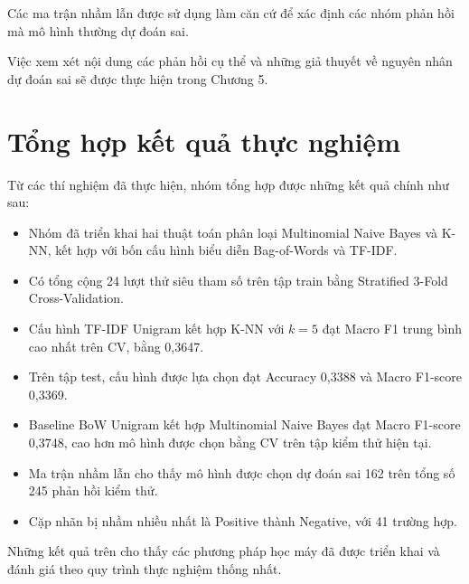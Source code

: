 Các ma trận nhầm lẫn được sử dụng làm căn cứ
để xác định các nhóm phản hồi mà mô hình
thường dự đoán sai.

Việc xem xét nội dung các phản hồi cụ thể
và những giả thuyết về nguyên nhân dự đoán
sai sẽ được thực hiện trong Chương 5.


\section{Tổng hợp kết quả thực nghiệm}

Từ các thí nghiệm đã thực hiện, nhóm tổng
hợp được những kết quả chính như sau:

\begin{itemize}

    \item Nhóm đã triển khai hai thuật toán
    phân loại Multinomial Naive Bayes và K-NN,
    kết hợp với bốn cấu hình biểu diễn
    Bag-of-Words và TF-IDF.

    \item Có tổng cộng 24 lượt thử siêu tham số
    trên tập train bằng Stratified 3-Fold
    Cross-Validation.

    \item Cấu hình TF-IDF Unigram kết hợp K-NN
    với $k=5$ đạt Macro F1 trung bình cao nhất
    trên CV, bằng 0,3647.

    \item Trên tập test, cấu hình được lựa chọn
    đạt Accuracy 0,3388 và Macro F1-score
    0,3369.

    \item Baseline BoW Unigram kết hợp
    Multinomial Naive Bayes đạt Macro F1-score
    0,3748, cao hơn mô hình được chọn bằng CV
    trên tập kiểm thử hiện tại.

    \item Ma trận nhầm lẫn cho thấy mô hình
    được chọn dự đoán sai 162 trên tổng số
    245 phản hồi kiểm thử.

    \item Cặp nhãn bị nhầm nhiều nhất là
    Positive thành Negative, với 41 trường hợp.

\end{itemize}

Những kết quả trên cho thấy các phương pháp
học máy đã được triển khai và đánh giá theo
quy trình thực nghiệm thống nhất.

